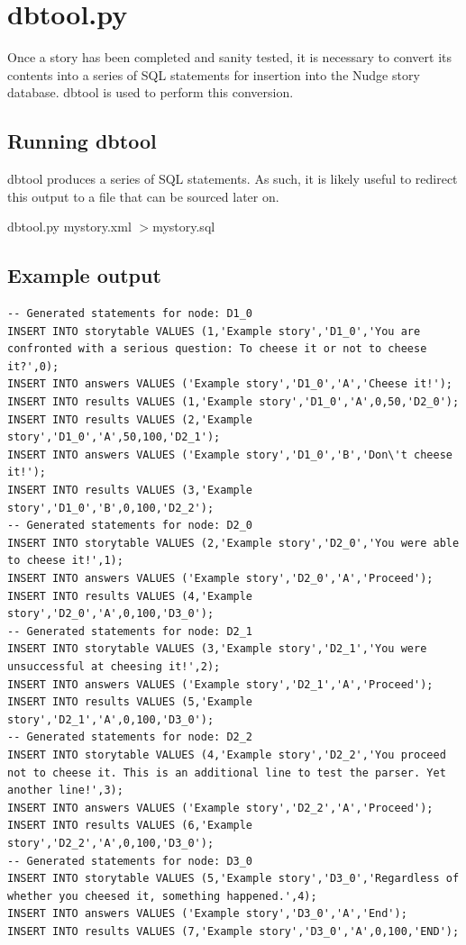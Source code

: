 \documentclass[12pt,letterpaper]{article}
\begin{document}
 \section{dbtool.py}
 Once a story has been completed and sanity tested, it is necessary to convert its contents into a series of 
 SQL statements for insertion into the Nudge story database. dbtool is used to perform this conversion.
 
 \subsection{Running dbtool}
 dbtool produces a series of SQL statements. As such, it is likely useful to redirect this output to a file that can 
 be sourced later on.
 
 \begin{center}
 dbtool.py mystory.xml $>$mystory.sql
 \end{center}
 
 \subsection{Example output}
 \begin{lstlisting}[breaklines=true]
-- Generated statements for node: D1_0
INSERT INTO storytable VALUES (1,'Example story','D1_0','You are confronted with a serious question: To cheese it or not to cheese it?',0);
INSERT INTO answers VALUES ('Example story','D1_0','A','Cheese it!');
INSERT INTO results VALUES (1,'Example story','D1_0','A',0,50,'D2_0');
INSERT INTO results VALUES (2,'Example story','D1_0','A',50,100,'D2_1');
INSERT INTO answers VALUES ('Example story','D1_0','B','Don\'t cheese it!');
INSERT INTO results VALUES (3,'Example story','D1_0','B',0,100,'D2_2');
-- Generated statements for node: D2_0
INSERT INTO storytable VALUES (2,'Example story','D2_0','You were able to cheese it!',1);
INSERT INTO answers VALUES ('Example story','D2_0','A','Proceed');
INSERT INTO results VALUES (4,'Example story','D2_0','A',0,100,'D3_0');
-- Generated statements for node: D2_1
INSERT INTO storytable VALUES (3,'Example story','D2_1','You were unsuccessful at cheesing it!',2);
INSERT INTO answers VALUES ('Example story','D2_1','A','Proceed');
INSERT INTO results VALUES (5,'Example story','D2_1','A',0,100,'D3_0');
-- Generated statements for node: D2_2
INSERT INTO storytable VALUES (4,'Example story','D2_2','You proceed not to cheese it. This is an additional line to test the parser. Yet another line!',3);
INSERT INTO answers VALUES ('Example story','D2_2','A','Proceed');
INSERT INTO results VALUES (6,'Example story','D2_2','A',0,100,'D3_0');
-- Generated statements for node: D3_0
INSERT INTO storytable VALUES (5,'Example story','D3_0','Regardless of whether you cheesed it, something happened.',4);
INSERT INTO answers VALUES ('Example story','D3_0','A','End');
INSERT INTO results VALUES (7,'Example story','D3_0','A',0,100,'END');
 \end{lstlisting}
 
 
\end{document}
